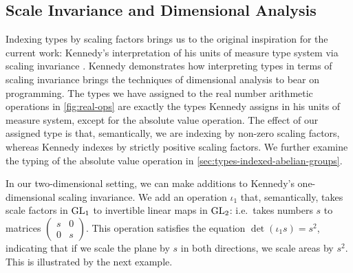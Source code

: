 
\subsection{Scale Invariance and Dimensional Analysis}
\label{sec:scale-invariance}

Indexing types by scaling factors brings us to the original
inspiration for the current work: Kennedy's interpretation of his
units of measure type system via scaling invariance
\cite{kennedy97relational}. Kennedy demonstrates how interpreting
types in terms of scaling invariance brings the techniques of
dimensional analysis  to bear on programming. The types we
have assigned to the real number arithmetic operations in
\autoref{fig:real-ops} are exactly the types Kennedy assigns in his
units of measure system, except for the absolute value operation. The
effect of our assigned type is that, semantically, we are indexing by
non-zero scaling factors, whereas Kennedy indexes by strictly positive
scaling factors. We further examine the typing of the absolute value
operation in \autoref{sec:types-indexed-abelian-groups}.

In our two-dimensional setting, we can make additions to Kennedy's
one-dimensional scaling invariance. We add an operation $\iota_1$
that, semantically, takes scale factors in $\mathrm{GL}_1$ to invertible
linear maps in $\mathrm{GL}_2$: i.e.~takes numbers $s$ to matrices $\left(
  \begin{smallmatrix}s & 0 \\ 0 & s\end{smallmatrix}\right)$.  This
operation satisfies the equation $\det (\iota_1 s) = s^2$, indicating
that if we scale the plane by $s$ in both directions, we scale areas
by $s^2$. This is illustrated by the next example.

